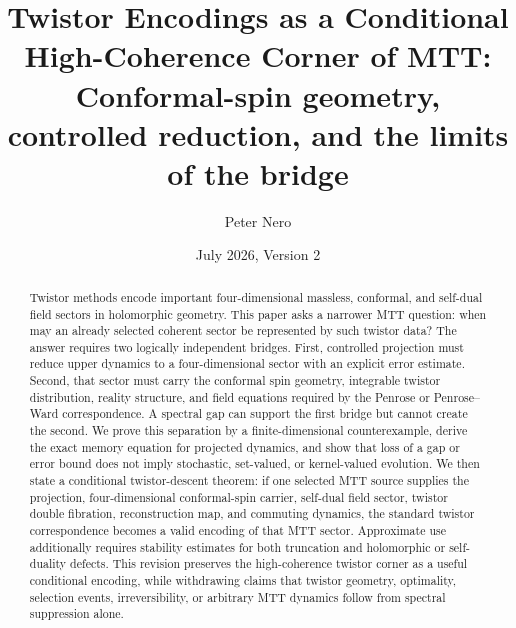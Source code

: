 \documentclass[11pt]{article}
\title{\textbf{Twistor Encodings as a Conditional High-Coherence Corner of MTT:}\\
\large Conformal-spin geometry, controlled reduction, and the limits of the bridge}
\author{Peter Nero}
\date{July 2026, Version 2}
\begin{document}
\maketitle

\begin{abstract}
Twistor methods encode important four-dimensional massless, conformal, and
self-dual field sectors in holomorphic geometry. This paper asks a narrower
MTT question: when may an already selected coherent sector be represented by
such twistor data? The answer requires two logically independent bridges.
First, controlled projection must reduce upper dynamics to a four-dimensional
sector with an explicit error estimate. Second, that sector must carry the
conformal spin geometry, integrable twistor distribution, reality structure,
and field equations required by the Penrose or Penrose--Ward correspondence.
A spectral gap can support the first bridge but cannot create the second.
We prove this separation by a finite-dimensional counterexample, derive the
exact memory equation for projected dynamics, and show that loss of a gap or
error bound does not imply stochastic, set-valued, or kernel-valued evolution.
We then state a conditional twistor-descent theorem: if one selected MTT
source supplies the projection, four-dimensional conformal-spin carrier,
self-dual field sector, twistor double fibration, reconstruction map, and
commuting dynamics, the standard twistor correspondence becomes a valid
encoding of that MTT sector. Approximate use additionally requires stability
estimates for both truncation and holomorphic or self-duality defects. This
revision preserves the high-coherence twistor corner as a useful conditional
encoding, while withdrawing claims that twistor geometry, optimality,
selection events, irreversibility, or arbitrary MTT dynamics follow from
spectral suppression alone.
\end{abstract}
\end{document}
